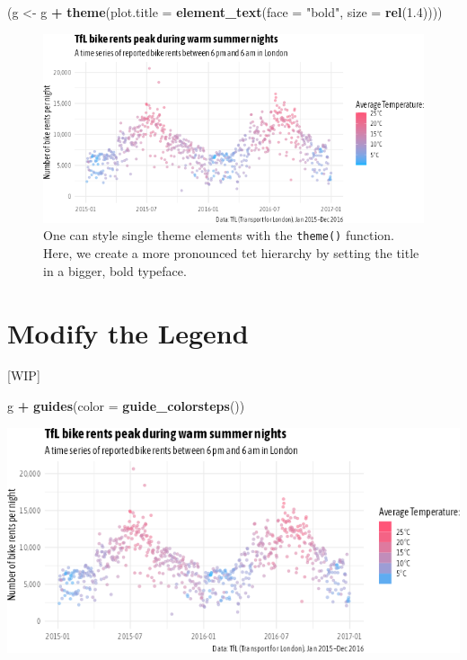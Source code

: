 \documentclass[
]{krantz}
\makeatletter
\newenvironment{Shaded}{\begin{snugshade}}{\end{snugshade}}
\newcommand{\AttributeTok}[1]{\textcolor[rgb]{0.27,0.27,0.27}{#1}}
\newcommand{\FloatTok}[1]{\textcolor[rgb]{0.06,0.06,0.06}{#1}}
\newcommand{\FunctionTok}[1]{\textcolor[rgb]{0.27,0.27,0.27}{\textbf{#1}}}
\newcommand{\NormalTok}[1]{#1}
\newcommand{\OtherTok}[1]{\textcolor[rgb]{0.37,0.37,0.37}{#1}}
\newcommand{\SpecialCharTok}[1]{\textcolor[rgb]{0.43,0.43,0.43}{\textbf{#1}}}
\newcommand{\StringTok}[1]{\textcolor[rgb]{0.5,0.5,0.5}{#1}}
\newenvironment{kframe}{%
\medskip{}
\setlength{\fboxsep}{.8em}
 \def\at@end@of@kframe{}%
 \ifinner\ifhmode%
  \def\at@end@of@kframe{\end{minipage}}%
  \begin{minipage}{\columnwidth}%
 \fi\fi%
 \def\FrameCommand##1{\hskip\@totalleftmargin \hskip-\fboxsep
 \colorbox{shadecolor}{##1}\hskip-\fboxsep
     \hskip-\linewidth \hskip-\@totalleftmargin \hskip\columnwidth}%
 \MakeFramed {\advance\hsize-\width
   \@totalleftmargin\z@ \linewidth\hsize
   \@setminipage}}%
 {\par\unskip\endMakeFramed%
 \at@end@of@kframe}
\renewenvironment{Shaded}{\begin{kframe}}{\end{kframe}}
\makeatother
\begin{document}
\begin{Shaded}
\begin{Highlighting}[]
\NormalTok{(g }\OtherTok{\textless{}{-}}\NormalTok{ g }\SpecialCharTok{+} \FunctionTok{theme}\NormalTok{(}\AttributeTok{plot.title =} \FunctionTok{element\_text}\NormalTok{(}\AttributeTok{face =} \StringTok{"bold"}\NormalTok{, }\AttributeTok{size =} \FunctionTok{rel}\NormalTok{(}\FloatTok{1.4}\NormalTok{))))}
\end{Highlighting}
\end{Shaded}

\begin{figure}
\centering
\includegraphics{bookdown_files/figure-latex/05textHierarchy-1.png}
\caption{\label{fig:05textHierarchy}One can style single theme elements with the \texttt{theme()} function. Here, we create a more pronounced tet hierarchy by setting the title in a bigger, bold typeface.}
\end{figure}

\hypertarget{modify-the-legend}{%
\section{Modify the Legend}\label{modify-the-legend}}

{[}WIP{]}

\begin{Shaded}
\begin{Highlighting}[]
\NormalTok{g }\SpecialCharTok{+} \FunctionTok{guides}\NormalTok{(}\AttributeTok{color =} \FunctionTok{guide\_colorsteps}\NormalTok{())}
\end{Highlighting}
\end{Shaded}

\includegraphics{bookdown_files/figure-latex/05guideColorsteps-1.png}
\end{document}
